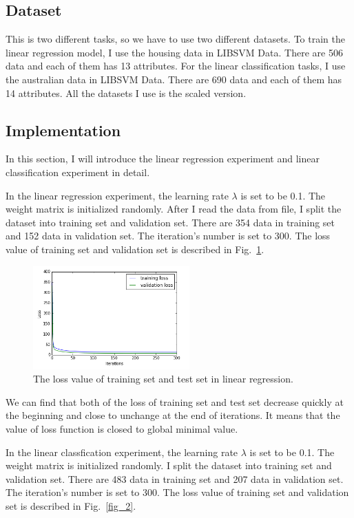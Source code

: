 \documentclass[journal, a4paper]{IEEEtran}
\begin{document}
\subsection{Dataset}
This is two different tasks, so we have to use two different datasets. To train the linear regression model, I use the housing data in LIBSVM Data. There are 506 data and each of them has 13 attributes. For the linear classification tasks, I use the australian data in LIBSVM Data. There are 690 data and each of them has 14 attributes. All the datasets I use is the scaled version.

\subsection{Implementation}
In this section, I will introduce the linear regression experiment and linear classification experiment in detail.

In the linear regression experiment, the learning rate $\lambda$ is set to be 0.1. The weight matrix is initialized randomly. After I read the data from file, I split the dataset into training set and validation set. There are 354 data in training set and 152 data in validation set. The iteration's number is set to 300. The loss value of training set and validation set is described in Fig.~\ref{fig_1}.
\begin{figure}[htbp]
\centerline{\includegraphics[height=150px]{line_1.png}}
\caption{The loss value of training set and test set in linear regression.}
\label{fig_1}
\end{figure}

We can find that both of the loss of training set and test set decrease quickly at the beginning and close to unchange at the end of iterations. It means that the value of loss function is closed to global minimal value.

In the linear classfication experiment, the learning rate $\lambda$ is set to be 0.1. The weight matrix is initialized randomly. I split the dataset into training set and validation set. There are 483 data in training set and 207 data in validation set. The iteration's number is set to 300. The loss value of training set and validation set is described in Fig.~\ref{fig_2}.
\end{document}

